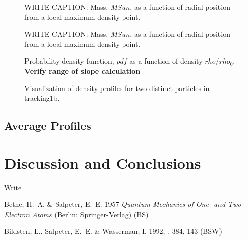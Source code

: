 \documentclass{emulateapj}
\begin{document}
\begin{figure}
\caption{WRITE CAPTION: Mass, $MSun$, as a function of radial position from a local maximum density point.     \label{fig:mass_example}}
\end{figure}


\begin{figure}
\caption{WRITE CAPTION: Mass, $MSun$, as a function of radial position from a local maximum density point.     \label{fig:angular_momentum_example}}
\end{figure}

\begin{figure}
\caption{Probability density function, $pdf$ as a function of density $rho/rho_0$.  \bf Verify range of slope calculation \label{fig:pdf_example}}
\end{figure}

\begin{figure}
\caption{Visualization of density profiles for two distinct particles in tracking1b. \label{fig:rho_example_132}}
\end{figure}

\subsection{Average Profiles}

\section{Discussion and Conclusions}

\acknowledgments

Write

\begin{references}

\noindent
Bethe, H.~A. \& Salpeter, E.~E. 1957 \textit{Quantum Mechanics of One-
  and Two-Electron Atoms} (Berlin: Springer-Verlag) (BS) 

\noindent
Bildsten, L., Salpeter, E.~E. \& Wasserman, I. 1992, \apj, 384, 143
(BSW) 


\end{references}
\end{document}
